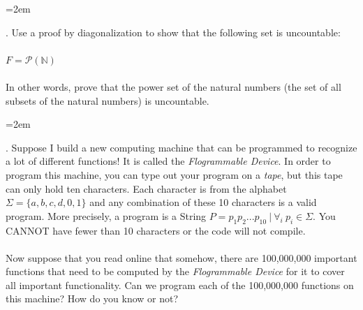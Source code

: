 \documentclass[12pt]{article}
\newcounter{quesnum}
\newcommand{\question}[2][??]{
\begin{list}{\labelitemi}{\leftmargin=2em}
\item [\arabic{quesnum}.] {} {#2}
\end{list}
\addtocounter{quesnum}{1}
}
\begin{document}
\question[3]{
Use a proof by diagonalization to show that the following set is uncountable:\\
\\
$F= \mathcal{P}(\mathbb{N}) $
\\
\\
In other words, prove that the power set of the natural numbers (the set of all subsets of the natural numbers) is uncountable.
}

\vspace{12pt}

\question[3]{
Suppose I build a new computing machine that can be programmed to recognize a lot of different functions! It is called the \emph{Flogrammable Device}. In order to program this machine, you can type out your program on a \emph{tape}, but this tape can only hold ten characters. Each character is from the alphabet $\Sigma=\{a,b,c,d,0,1\}$ and any combination of these 10 characters is a valid program. More precisely, a program is a String $P = p_1p_2...p_{10} \ | \ \forall_i \ p_i \in \Sigma$. You CANNOT have fewer than 10 characters or the code will not compile.\\
\\
Now suppose that you read online that somehow, there are 100,000,000 important functions that need to be computed by the \emph{Flogrammable Device} for it to cover all important functionality. Can we program each of the 100,000,000 functions on this machine? How do you know or not?
}
\end{document}
